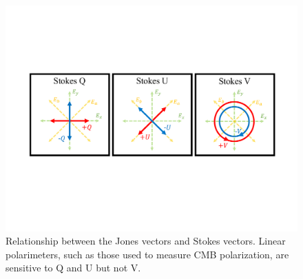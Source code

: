 \begin{figure}[!t]
    \centering
    \includegraphics[width=\linewidth, trim=2cm 7cm 2cm 6cm, clip]{PolarizationModulation/Figures/stokes_parameters.pdf}
    \caption{Relationship between the Jones vectors and Stokes vectors. Linear polarimeters, such as those used to measure CMB polarization, are sensitive to Q and U but not V.}
    \label{fig:stokes_parameters}
\end{figure}

